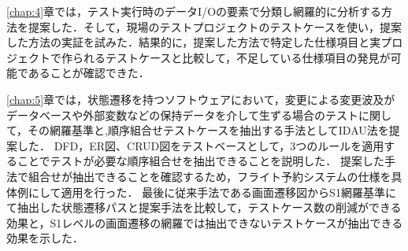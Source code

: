 \documentclass[10pt,a4j]{jarticle}
\begin{document}
\ref{chap:4}章では，テスト実行時のデータI/Oの要素で分類し網羅的に分析する方法を提案した．そして，現場のテストプロジェクトのテストケースを使い，提案した方法の実証を試みた．結果的に，提案した方法で特定した仕様項目と実プロジェクトで作られるテストケースと比較して，不足している仕様項目の発見が可能であることが確認できた．

\ref{chap:5}章では，状態遷移を持つソフトウェアにおいて，変更による変更波及がデータベースや外部変数などの保持データを介して生ずる場合のテストに関して，その網羅基準と,順序組合せテストケースを抽出する手法としてIDAU法を提案した．
DFD，ER図、CRUD図をテストベースとして，3つのルールを適用することでテストが必要な順序組合せを抽出できることを説明した．
提案した手法で組合せが抽出できることを確認するため，フライト予約システムの仕様を具体例にして適用を行った．
最後に従来手法である画面遷移図からS1網羅基準にて抽出した状態遷移パスと提案手法を比較して，テストケース数の削減ができる効果と，S1レベルの画面遷移の網羅では抽出できないテストケースが抽出できる効果を示した．

\nocite{*}


\end{document}
